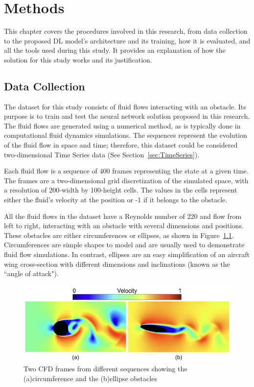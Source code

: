 
\chapter{Methods}
\label{ch:Methods}
This chapter covers the procedures involved in this research, from data collection to the proposed DL model's architecture and its training, how it is evaluated, and all the tools used during this study. It provides an explanation of how the solution for this study works and its justification.

\section{Data Collection}
\label{sec:DataCollection}
The dataset for this study consists of fluid flows interacting with an obstacle. Its purpose is to train and test the neural network solution proposed in this research. The fluid flows are generated using a numerical method, as is typically done in computational fluid dynamics simulations. The sequences represent the evolution of the fluid flow in space and time; therefore, this dataset could be considered two-dimensional Time Series data (See Section~\ref{sec:TimeSeries}).

Each fluid flow is a sequence of $400$ frames representing the state at a given time. The frames are a two-dimensional grid discretization of the simulated space, with a resolution of 200-width by 100-height cells. The values in the cells represent either the fluid's velocity at the position or -1 if it belongs to the obstacle. 

All the fluid flows in the dataset have a Reynolds number of 220 and flow from left to right, interacting with an obstacle with several dimensions and positions. These obstacles are either circumferences or ellipses, as shown in Figure~\ref{fig:cfd_obstacles}. Circumferences are simple shapes to model and are usually used to demonstrate fluid flow simulations. In contrast, ellipses are an easy simplification of an aircraft wing cross-section with different dimensions and inclinations (known as the ``angle of attack").

\begin{figure}[!h]
    \centering
    \includegraphics[width=0.9\linewidth]{images/cfd_obstacle_examples.png}
    \caption{Two CFD frames from different sequences showing the (a)circumference and the (b)ellipse obstacles}
    \label{fig:cfd_obstacles}
\end{figure}

